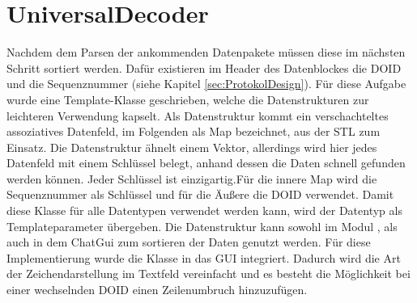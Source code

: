 \section{UniversalDecoder}

Nachdem dem Parsen der ankommenden Datenpakete müssen diese im nächsten
Schritt sortiert werden. Daf{\"u}r existieren im Header des Datenblockes die
\gls{DOID} und die Sequenznummer (siehe Kapitel \ref{sec:ProtokolDesign}).
F{\"u}r diese Aufgabe wurde eine Template-Klasse 
geschrieben, welche die Datenstrukturen zur leichteren Verwendung kapselt. Als
Datenstruktur kommt ein verschachteltes assoziatives Datenfeld, im Folgenden als
Map bezeichnet, aus der \gls{STL} zum Einsatz. Die Datenstruktur {\"a}hnelt
einem Vektor, allerdings wird hier jedes Datenfeld mit einem Schlüssel belegt,
anhand dessen die Daten schnell gefunden werden können. Jeder Schl{\"u}ssel ist
einzigartig.\newline F{\"u}r die innere Map wird die
Sequenznummer als Schl{\"u}ssel und für die {\"A}ußere die \gls{DOID} verwendet.
Damit diese Klasse für alle Datentypen verwendet werden kann, wird der Datentyp
als Templateparameter {\"u}bergeben. Die Datenstruktur kann sowohl im Modul
, als auch in dem ChatGui zum sortieren der Daten genutzt
werden. F{\"u}r diese Implementierung wurde die Klasse in das \gls{GUI}
integriert. Dadurch wird die Art der Zeichendarstellung im Textfeld
vereinfacht und es besteht die Möglichkeit bei einer wechselnden \gls{DOID} einen
Zeilenumbruch hinzuzufügen.
